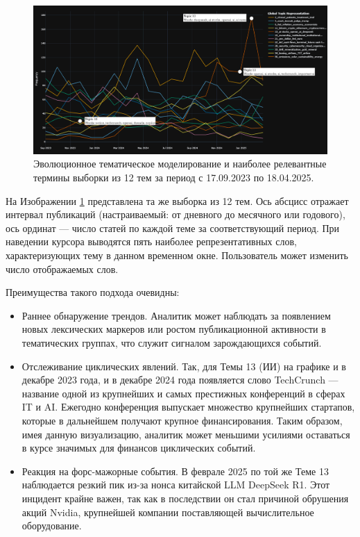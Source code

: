 \begin{figure}[H]
    \centering
    \includegraphics[width=1\linewidth]{img/dynamic_topic_modeling.png}
    \caption{Эволюционное тематическое моделирование и наиболее релевантные термины выборки из 12 тем за период с 17.09.2023 по 18.04.2025.}
    \label{fig:dtm}
\end{figure}

На Изображении \ref{fig:dtm} представлена та же выборка из 12 тем. Ось абсцисс отражает интервал публикаций (настраиваемый:
от дневного до месячного или годового), ось ординат --- число статей по каждой теме за соответствующий период. При наведении
курсора выводятся пять наиболее репрезентативных слов, характеризующих тему в данном временном окне. Пользователь может
изменить число отображаемых слов.

Преимущества такого подхода очевидны:

\begin{itemize}
    \item Раннее обнаружение трендов. Аналитик может наблюдать за появлением новых лексических маркеров
    или ростом публикационной активности в тематических группах, что служит сигналом зарождающихся событий.
    \item Отслеживание циклических явлений. Так, для Темы 13 (ИИ) на графике и в декабре 2023 года,
    и в декабре 2024 года появляется слово TechCrunch — название одной из крупнейших и самых престижных
    конференций в сферах IT и AI. Ежегодно конференция выпускает множество крупнейших стартапов, которые
    в дальнейшем получают крупное финансирования. Таким образом, имея данную визуализацию, аналитик может
    меньшими усилиями оставаться в курсе значимых для финансов циклических событий.
    \item Реакция на форс-мажорные события. В феврале 2025 по той же Теме 13 наблюдается резкий пик из-за
    нонса китайской LLM DeepSeek R1. Этот инцидент крайне важен, так как в последствии он стал причиной обрушения
    акций Nvidia, крупнейшей компании поставляющей вычислительное оборудование.
\end{itemize}

